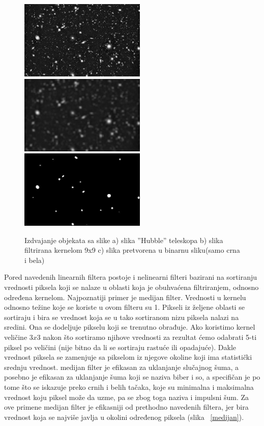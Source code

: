 \documentclass[a4paper,12pt,titlepage]{article}
\begin{document}
\begin{figure}[ht!]
\centering
\includegraphics[width=60mm]{img/tel.jpg}
\includegraphics[width=60mm]{img/telAvg.jpg}
\includegraphics[width=60mm]{img/telTh.jpg}
\caption{Izdvajanje objekata sa slike a) slika ''Hubble'' teleskopa b) slika filtrirana kernelom 9x9 c) slika pretvorena u binarnu sliku(samo crna i bela)}
\label{zvezde}
\end{figure}

Pored navedenih linearnih filtera postoje i nelinearni filteri bazirani na sortiranju vrednosti piksela koji se nalaze u oblasti koja je obuhvaćena filtriranjem, odnosno određena kernelom. Najpoznatiji primer je medijan filter. Vrednosti u kernelu odnosno težine koje se koriste u ovom filteru su 1. Pikseli iz željene oblasti se sortiraju i bira se vrednost koja se u tako sortiranom nizu piksela nalazi na sredini. Ona se dodeljuje pikselu koji se trenutno obrađuje. Ako koristimo kernel veličine $3 x 3$ nakon što sortiramo njihove vrednosti za rezultat ćemo odabrati 5-ti piksel po veličini (nije bitno da li se sortiraju rastuće ili opadajuće). Dakle vrednost piksela se zamenjuje sa pikselom iz njegove okoline koji ima statistički srednju vrednost. medijan filter je efikasan za uklanjanje slučajnog šuma, a posebno je efikasan za uklanjanje šuma koji se naziva biber i so, a specifičan je po tome što se iskazuje preko crnih i belih tačaka, koje su minimalna i maksimalna vrednost koju piksel može da uzme, pa se zbog toga naziva i impulsni šum. Za ove primene medijan filter je efikasniji od prethodno navedenih filtera, jer bira vrednost koja se najviše javlja u okolini određenog piksela (slika ~\ref{medijan}).
\end{document}
